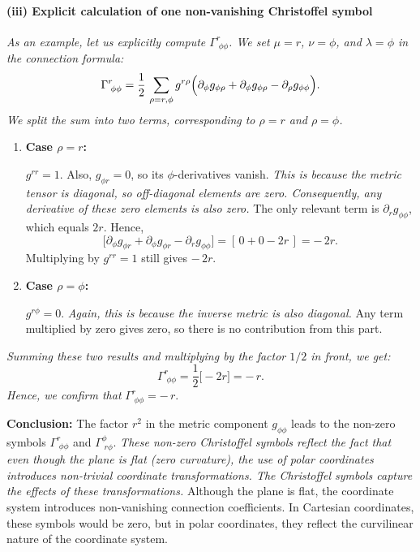 \bigskip

\paragraph{(iii) Explicit calculation of one non-vanishing Christoffel symbol}

\emph{As an example, let us explicitly compute \(\Gamma^r_{\;\phi\phi}\). We set \(\mu = r\), \(\nu = \phi\), and \(\lambda = \phi\) in the connection formula:}
\[
\Gamma^r_{\;\phi\phi}
=
\frac{1}{2}\,
\sum_{\rho = r,\phi}
g^{r\rho}
\Bigl(
\partial_\phi g_{\phi\rho}
+
\partial_\phi g_{\phi\rho}
-
\partial_\rho g_{\phi\phi}
\Bigr).
\]
\emph{We split the sum into two terms, corresponding to \(\rho = r\) and \(\rho = \phi\).}

\begin{enumerate}
\item \textbf{Case \(\rho = r\):}

\(g^{r r} = 1\). Also, \(g_{\phi r} = 0\), so its \(\phi\)-derivatives vanish. \emph{This is because the metric tensor is diagonal, so off-diagonal elements are zero. Consequently, any derivative of these zero elements is also zero.} The only relevant term is \(\partial_r g_{\phi\phi}\), which equals \(2r\). Hence,
\[
\bigl[\partial_\phi g_{\phi r} + \partial_\phi g_{\phi r} - \partial_r g_{\phi\phi}\bigr]
=
[\,0 + 0 - 2r\,]
= -\,2r.
\]
Multiplying by \(g^{rr} = 1\) still gives \(-\,2r\).

\item \textbf{Case \(\rho = \phi\):}

\(g^{r\phi} = 0\). \emph{Again, this is because the inverse metric is also diagonal.} Any term multiplied by zero gives zero, so there is no contribution from this part.
\end{enumerate}

\emph{Summing these two results and multiplying by the factor \(1/2\) in front, we get:}
\[
\Gamma^r_{\;\phi\phi}
=
\frac12 \bigl[-2r\bigr]
=
-\,r.
\]
\emph{Hence, we confirm that}
\(\boxed{\Gamma^r_{\;\phi\phi} = -\,r}.\)

\bigskip

\textbf{Conclusion:} The factor \(r^2\) in the metric component \(g_{\phi\phi}\) leads to the non-zero symbols \(\Gamma^r_{\;\phi\phi}\) and \(\Gamma^\phi_{\;r\phi}\). \emph{These non-zero Christoffel symbols reflect the fact that even though the plane is flat (zero curvature), the use of polar coordinates introduces non-trivial coordinate transformations. The Christoffel symbols capture the effects of these transformations.} Although the plane is flat, the coordinate system introduces non-vanishing connection coefficients. In Cartesian coordinates, these symbols would be zero, but in polar coordinates, they reflect the curvilinear nature of the coordinate system.



